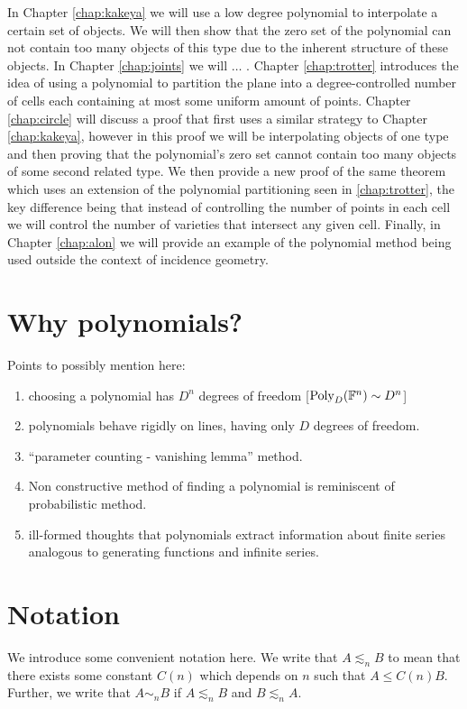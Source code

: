 In Chapter \ref{chap:kakeya} we will use a low degree polynomial to interpolate a certain set of objects. We will then show that the zero set of the polynomial can not contain 
too many objects of this type due to the inherent structure of these objects. In Chapter \ref{chap:joints} we will $\dots$ .
Chapter \ref{chap:trotter} introduces the idea of using a polynomial to partition the plane into a degree-controlled number of cells each containing at most some uniform amount of points.
Chapter \ref{chap:circle} will discuss a proof that first uses a similar strategy to Chapter \ref{chap:kakeya}, however in this proof we will be interpolating
objects of one type and then proving that the polynomial's zero set cannot contain too many objects of some second related type. 
We then provide a new proof of the same theorem which uses an extension of the polynomial partitioning seen in \ref{chap:trotter}, the key difference being that
instead of controlling the number of points in each cell we will control the number of varieties that intersect any given cell. Finally, in Chapter \ref{chap:alon} we will provide an example
of the polynomial method being used outside the context of incidence geometry.

\section{Why polynomials?}

Points to possibly mention here:
\begin{enumerate}
    \item choosing a polynomial has $D^n$ degrees of freedom [$\text{Poly}_D(\mathbb F^n) \sim D^n$]
    \item polynomials behave rigidly on lines, having only $D$ degrees of freedom.
    \item ``parameter counting - vanishing lemma'' method. 
    \item Non constructive method of finding a polynomial is reminiscent of probabilistic method.\cite{GOW2020} \cite{GUTH2016}
    \item ill-formed thoughts that polynomials extract information about finite series analogous to generating functions and infinite series. 
\end{enumerate}

\section*{Notation}
We introduce some convenient notation here. We write that $A \lesssim_n B$ to mean that there exists some constant
$C(n)$ which depends on $n$ such that $A \leq C(n) B$. Further, we write that $A \sim_n B$ if $A \lesssim_n B$ and $B \lesssim_n A$.

